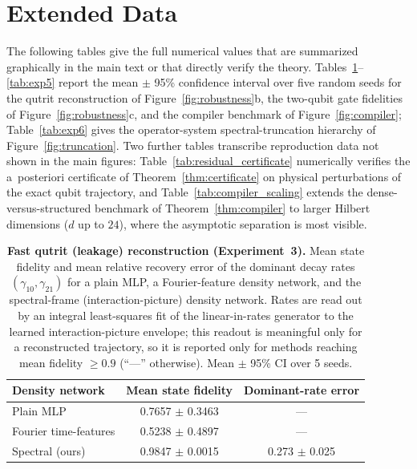 \documentclass[11pt]{article}
\newcommand{\sync}[1]{#1}
\begin{document}
\section*{Extended Data}
The following tables give the full numerical values that are summarized graphically in the main text or that directly verify the theory. Tables~\ref{tab:exp3}--\ref{tab:exp5} report the mean $\pm$ 95\% confidence interval over five random seeds for the qutrit reconstruction of Figure~\ref{fig:robustness}b, the two-qubit gate fidelities of Figure~\ref{fig:robustness}c, and the compiler benchmark of Figure~\ref{fig:compiler}; Table~\ref{tab:exp6} gives the operator-system spectral-truncation hierarchy of Figure~\ref{fig:truncation}. Two further tables transcribe reproduction data not shown in the main figures: Table~\ref{tab:residual_certificate} numerically verifies the a~posteriori certificate of Theorem~\ref{thm:certificate} on physical perturbations of the exact qubit trajectory, and Table~\ref{tab:compiler_scaling} extends the dense-versus-structured benchmark of Theorem~\ref{thm:compiler} to larger Hilbert dimensions ($d$ up to $24$), where the asymptotic separation is most visible.

\begin{table}[ht]
\centering
\caption{\textbf{Fast qutrit (leakage) reconstruction (Experiment~3).} Mean state fidelity and mean relative recovery error of the dominant decay rates $(\gamma_{10},\gamma_{21})$ for a plain MLP, a Fourier-feature density network, and the spectral-frame (interaction-picture) density network. Rates are read out by an integral least-squares fit of the linear-in-rates generator to the learned interaction-picture envelope; this readout is meaningful only for a reconstructed trajectory, so it is reported only for methods reaching mean fidelity $\ge0.9$ (``---'' otherwise). Mean $\pm$ 95\% CI over 5 seeds.}
\label{tab:exp3}
\begin{tabular}{lcc}
\toprule
Density network & Mean state fidelity & Dominant-rate error \\
\midrule
Plain MLP & \sync{0.7657 $\pm$ 0.3463} & \sync{---} \\
Fourier time-features & \sync{0.5238 $\pm$ 0.4897} & \sync{---} \\
Spectral (ours) & \sync{0.9847 $\pm$ 0.0015} & \sync{0.273 $\pm$ 0.025} \\
\bottomrule
\end{tabular}
\end{table}
\end{document}
